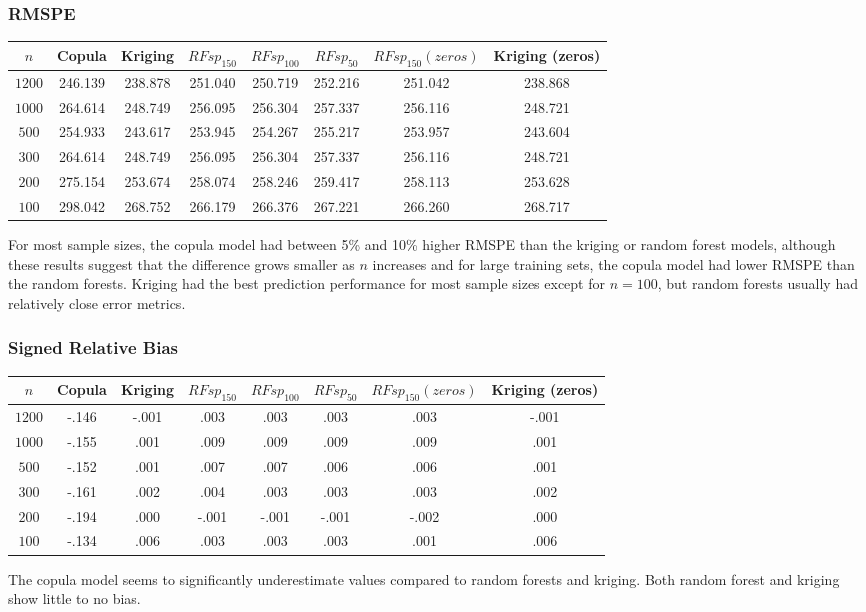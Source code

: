 \documentclass{article}
\begin{document}
\subsubsection{RMSPE}
\begin{center}
\begin{tabular}{|| c | c c c c c c c ||}
\hline
$n$ & Copula & Kriging & $RFsp_{150}$ & $RFsp_{100}$ & $RFsp_{50}$ & $RFsp_{150}(zeros)$ & Kriging (zeros) \\ [.5ex] 
\hline\hline
	$1200$ & 246.139 & 238.878 & 251.040 & 250.719 & 252.216 & 251.042 & 238.868 \\
	$1000$ & 264.614 & 248.749 & 256.095 & 256.304 & 257.337 & 256.116 & 248.721 \\
	$500$ & 254.933 & 243.617 & 253.945 & 254.267 & 255.217 & 253.957 & 243.604 \\
	$300$ & 264.614 & 248.749 & 256.095 & 256.304 & 257.337 & 256.116 & 248.721 \\
	$200$ & 275.154 & 253.674 & 258.074 & 258.246 & 259.417 & 258.113 & 253.628 \\
	$100$ & 298.042 & 268.752 & 266.179 & 266.376 & 267.221 & 266.260 & 268.717 \\ [.5ex] 
\hline
\end{tabular}
\end{center}
For most sample sizes, the copula model had between 5\% and 10\% higher RMSPE than the kriging or random forest models, although these results suggest that the difference grows smaller as $n$ increases and for large training sets, the copula model had lower RMSPE than the random forests.
Kriging had the best prediction performance for most sample sizes except for $n = 100$, but random forests usually had relatively close error metrics.

\subsubsection{Signed Relative Bias}
\begin{center}
\begin{tabular}{|| c | c c c c c c c ||}
\hline
$n$ & Copula & Kriging & $RFsp_{150}$ & $RFsp_{100}$ & $RFsp_{50}$ & $RFsp_{150}(zeros)$ & Kriging (zeros) \\ [.5ex] 
\hline\hline
	$1200$ & -.146 & -.001 & .003 & .003 & .003 & .003 & -.001 \\
	$1000$ & -.155 & .001 & .009 & .009 & .009 & .009 & .001 \\
	$500$ & -.152 & .001 & .007 & .007 & .006 & .006 & .001 \\
	$300$ & -.161 & .002 & .004 & .003 & .003 & .003 & .002 \\
	$200$ & -.194 & .000 & -.001 & -.001 & -.001 & -.002 & .000 \\
	$100$ & -.134 & .006 & .003 & .003 & .003 & .001 & .006 \\ [.5ex] 
\hline
\end{tabular}
\end{center}
The copula model seems to significantly underestimate values compared to random forests and kriging.
Both random forest and kriging show little to no bias.
\end{document}
